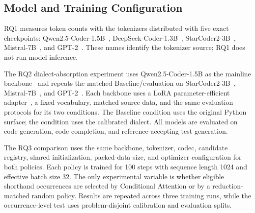 \subsection{Model and Training Configuration}
\label{sec:setup}

RQ1 measures token counts with the tokenizers distributed with five exact checkpoints: Qwen2.5-Coder-1.5B~\cite{qwen2024}, DeepSeek-Coder-1.3B~\cite{deepseekcoder2024}, StarCoder2-3B~\cite{starcoder2_2024}, Mistral-7B~\cite{mistral2023}, and GPT-2~\cite{radford2019gpt2}. These names identify the tokenizer source; RQ1 does not run model inference.

The RQ2 dialect-absorption experiment uses Qwen2.5-Coder-1.5B as the
mainline backbone~\cite{qwen2024} and repeats the matched Baseline/\tool evaluation on
StarCoder2-3B~\cite{starcoder2_2024}, Mistral-7B~\cite{mistral2023}, and GPT-2~\cite{radford2019gpt2}. Each backbone uses a
LoRA parameter-efficient adapter~\cite{hu2022lora}, a fixed \tool vocabulary, matched source data,
and the same evaluation protocols for its two conditions. The Baseline condition uses the original Python surface; the \tool condition uses the calibrated dialect. All models are evaluated
on code generation, code completion, and reference-accepting test generation.

The RQ3 comparison uses the same backbone, tokenizer, codec, candidate registry, shared initialization, packed-data size, and optimizer configuration for both policies. Each policy is trained for 100 steps with sequence length 1024 and effective batch size 32. The only experimental variable is whether eligible shorthand occurrences are selected by Conditional Attention or by a reduction-matched random policy. Results are repeated across three training runs, while the occurrence-level test uses problem-disjoint calibration and evaluation splits.
